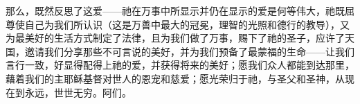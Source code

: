 那么，既然反思了这爱——祂在万事中所显示并仍在显示的爱是何等伟大，祂既屈尊使自己为我们所认识（这是万善中最大的冠冕，理智的光照和德行的教导），又为最美好的生活方式制定了法律，且为我们做了万事，赐下了祂的圣子，应许了天国，邀请我们分享那些不可言说的美好，并为我们预备了最蒙福的生命——让我们言行一致，好显得配得上祂的爱，并获得将来的美好；愿我们众人都能到达那里，藉着我们的主耶稣基督对世人的恩宠和慈爱；愿光荣归于祂，与圣父和圣神，从现在到永远，世世无穷。阿们。\par

